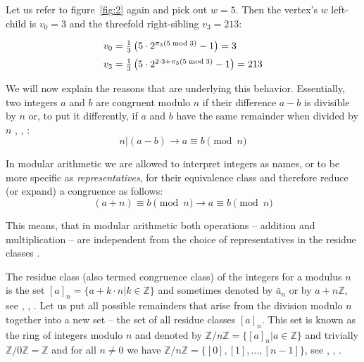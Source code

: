\begin{example}
\label{ex:siblings}
Let us refer to figure~\ref{fig:2} again and pick out $w=5$. Then the	vertex's $w$ left-child is $v_0=3$ and the threefold right-sibling
$v_3=213$:

\begin{equation*}
\begin{array}{l}
	v_0=\frac{1}{3}\left(5\cdot2^{\pi_3(5\bmod 3)}-1\right)=3
	\\[\medskipamount]
	v_3=\frac{1}{3}\left(5\cdot2^{2\cdot3+\pi_3(5\bmod 3)}-1\right)=213
\end{array}
\end{equation*}
\end{example}

We will now explain the reasons that are underlying this behavior. Essentially, two integers $a$ and $b$ are congruent modulo $n$ if their difference $a-b$ is divisible by $n$ or, to put it differently, if $a$ and $b$ have the same remainder when divided by $n$ \cite[p.~15]{Ref_Wolfart_2011}, \cite[p.~44]{Ref_Forster_2015}, \cite[p.~19]{Ref_Mueller-Stach_2011}:
\begin{equation}
\label{eq:congruence}
n|(a-b)\rightarrow a\equiv b\pmod n
\end{equation}

In modular arithmetic we are allowed to interpret integers as names, or to be more specific as \textit{representatives}, for their equivalence class and therefore reduce (or expand) a congruence as follows:
\begin{equation}
\label{eq:congruence_reduction}
(a+n)\equiv b\pmod n\rightarrow a\equiv b\pmod n
\end{equation}

This means, that in modular arithmetic both operations -- addition and multiplication -- are independent from the choice of representatives in the residue classes \cite[p.~16]{Ref_Wolfart_2011}.

The residue class (also termed congruence class) of the integers for a modulus $n$ is the set $[a]_n=\{a+k\cdot n|k\in\mathbb{Z}\}$ and sometimes denoted by $\bar a_n$ or by $a+n\mathbb{Z}$, see \cite[p.~15]{Ref_Wolfart_2011}, \cite[p.~120]{Ref_Schubert_2009}, \cite[p.~25]{Ref_Mueller-Stach_2011}. Let us put all possible remainders that arise from the division modulo $n$ together into a new set -- the set of all residue classes $[a]_n$. This set is known as the ring of integers modulo $n$ and denoted by $\mathbb{Z}/n\mathbb{Z}=\{[a]_n|a\in\mathbb{Z}\}$ and trivially $\mathbb{Z}/0\mathbb{Z}=\mathbb{Z}$ and for all $n\ne0$ we have $\mathbb{Z}/n\mathbb{Z}=\{[0],[1],\ldots,[n-1]\}$, see \cite[p.~15]{Ref_Wolfart_2011}, \cite[p.~25]{Ref_Mueller-Stach_2011}, \cite[p.~81]{Ref_Teschl_2013}.

